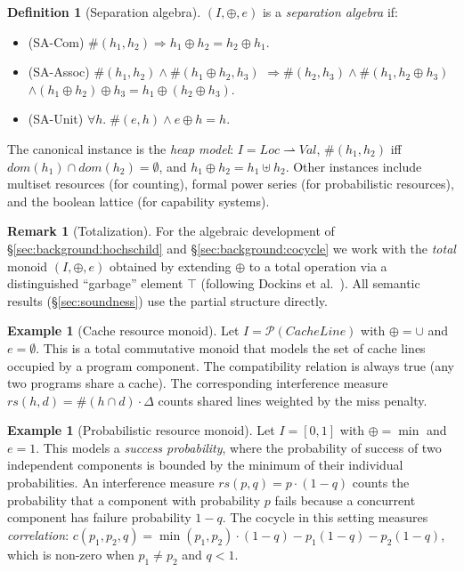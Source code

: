 \documentclass[acmsmall,sigplan,anonymous,review,screen]{acmart}
\theoremstyle{plain}
\theoremstyle{definition}
\newtheorem{definition}[theorem]{Definition}
\newtheorem{example}[theorem]{Example}
\newtheorem{remark}[theorem]{Remark}
\newcommand{\rs}{\mathit{rs}}
\begin{document}
\begin{definition}[Separation algebra]
\label{def:sepalg}
  $(I, \oplus, e)$ is a \emph{separation algebra} if:
  \begin{itemize}[itemsep=2pt]
    \item (SA-Com) $\#(h_1, h_2) \Rightarrow h_1 \oplus h_2 = h_2 \oplus h_1$.
    \item (SA-Assoc) $\#(h_1, h_2) \land \#(h_1 \oplus h_2, h_3)$
        $\Rightarrow \#(h_2, h_3) \land \#(h_1, h_2 \oplus h_3)$
        $\land (h_1 \oplus h_2) \oplus h_3 = h_1 \oplus (h_2 \oplus h_3)$.
    \item (SA-Unit) $\forall h.\; \#(e, h) \land e \oplus h = h$.
  \end{itemize}
\end{definition}

The canonical instance is the \emph{heap model}: $I = \mathit{Loc}
\rightharpoonup \mathit{Val}$, $\#(h_1, h_2)$ iff $\mathit{dom}(h_1)
\cap \mathit{dom}(h_2) = \emptyset$, and $h_1 \oplus h_2 = h_1 \uplus
h_2$.  Other instances include multiset resources (for counting), formal
power series (for probabilistic resources), and the boolean lattice (for
capability systems).

\begin{remark}[Totalization]
  For the algebraic development of \S\ref{sec:background:hochschild} and
  \S\ref{sec:background:cocycle} we work with the \emph{total} monoid
  $(I, \oplus, e)$ obtained by extending $\oplus$ to a total operation
  via a distinguished ``garbage'' element $\top$ (following
  Dockins et al.~\cite{dockins2009separation}).  All semantic results
  (\S\ref{sec:soundness}) use the partial structure directly.
\end{remark}

\begin{example}[Cache resource monoid]
\label{ex:cache}
  Let $I = \mathcal{P}(\mathit{CacheLine})$ with
  $\oplus = \cup$ and $e = \emptyset$.  This is a total commutative
  monoid that models the set of cache lines occupied by a program
  component.  The compatibility relation is always true (any two
  programs share a cache).  The corresponding interference measure
  $\rs(h, d) = \#(h \cap d) \cdot \Delta$ counts shared lines weighted
  by the miss penalty.
\end{example}

\begin{example}[Probabilistic resource monoid]
\label{ex:prob}
  Let $I = [0,1]$ with $\oplus = \min$ and $e = 1$.  This models
  a \emph{success probability}, where the probability of success of
  two independent components is bounded by the minimum of their
  individual probabilities.  An interference measure
  $\rs(p, q) = p \cdot (1 - q)$ counts the probability that a component
  with probability $p$ fails because a concurrent component has
  failure probability $1 - q$.  The cocycle in this setting measures
  \emph{correlation}: $c(p_1, p_2, q) = \min(p_1, p_2) \cdot (1-q)
  - p_1 (1-q) - p_2 (1-q)$, which is non-zero when $p_1 \neq p_2$
  and $q < 1$.
\end{example}
\end{document}
